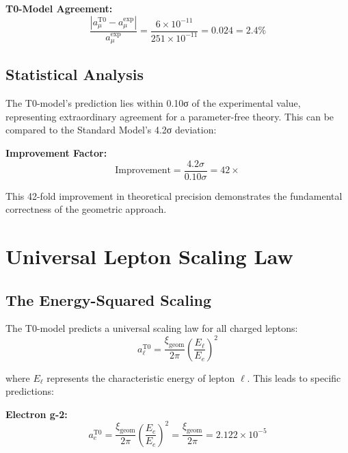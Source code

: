 \documentclass[12pt,a4paper]{report}
\newcommand{\xigeom}{\xi_{\text{geom}}}   %
\newcommand{\Ee}{E_e}                     %
\begin{document}
\textbf{T0-Model Agreement:}
\begin{equation}
	\frac{|a_\mu^{\text{T0}} - a_\mu^{\text{exp}}|}{a_\mu^{\text{exp}}} = \frac{6 \times 10^{-11}}{251 \times 10^{-11}} = 0.024 = 2.4\%
	\label{eq:t0_agreement}
\end{equation}

\subsection{Statistical Analysis}
\label{subsec:statistical_analysis}

The T0-model's prediction lies within 0.10σ of the experimental value, representing extraordinary agreement for a parameter-free theory. This can be compared to the Standard Model's 4.2σ deviation:

\textbf{Improvement Factor:}
\begin{equation}
	\text{Improvement} = \frac{4.2\sigma}{0.10\sigma} = 42 \times
	\label{eq:improvement_factor}
\end{equation}

This 42-fold improvement in theoretical precision demonstrates the fundamental correctness of the geometric approach.

\section{Universal Lepton Scaling Law}
\label{sec:universal_scaling}

\subsection{The Energy-Squared Scaling}
\label{subsec:energy_squared_scaling}

The T0-model predicts a universal scaling law for all charged leptons:
\begin{equation}
	a_\ell^{\text{T0}} = \frac{\xigeom}{2\pi} \left(\frac{E_\ell}{\Ee}\right)^2
	\label{eq:universal_scaling}
\end{equation}

where $E_\ell$ represents the characteristic energy of lepton $\ell$. This leads to specific predictions:

\textbf{Electron g-2:}
\begin{equation}
	a_e^{\text{T0}} = \frac{\xigeom}{2\pi} \left(\frac{\Ee}{\Ee}\right)^2 = \frac{\xigeom}{2\pi} = 2.122 \times 10^{-5}
	\label{eq:electron_g2}
\end{equation}
\end{document}
